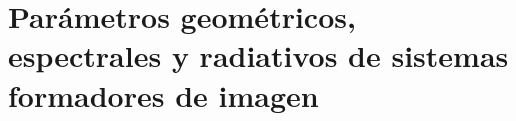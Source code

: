 

\section{Parámetros geométricos, espectrales y radiativos de sistemas formadores de imagen}

% 




